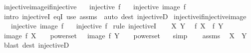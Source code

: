 \begin{isabellebody}
\ injective{\isacharunderscore}{\kern0pt}image{\isacharunderscore}{\kern0pt}if{\isacharunderscore}{\kern0pt}injective{\isacharcolon}{\kern0pt}\isanewline
\ \ \ {\isachardoublequoteopen}injective\ f{\isachardoublequoteclose}\isanewline
\ \ \ {\isachardoublequoteopen}injective\ {\isacharparenleft}{\kern0pt}image\ f{\isacharparenright}{\kern0pt}{\isachardoublequoteclose}\isanewline
%
\isadelimproof
\ \ %
\endisadelimproof
%
\isatagproof
{}\isamarkupfalse%
\ {\isacharparenleft}{\kern0pt}intro\ injectiveI\ eqI{\isacharparenright}{\kern0pt}\ {\isacharparenleft}{\kern0pt}use\ assms\ \ {\isacartoucheopen}auto\ dest{\isacharcolon}{\kern0pt}\ injectiveD{\isacartoucheclose}{\isacharparenright}{\kern0pt}%
\endisatagproof
{\isafoldproof}%
%
\isadelimproof
\isanewline
%
\endisadelimproof
\isanewline
{}\isamarkupfalse%
\ injective{\isacharunderscore}{\kern0pt}if{\isacharunderscore}{\kern0pt}injective{\isacharunderscore}{\kern0pt}image{\isacharcolon}{\kern0pt}\isanewline
\ \ \ {\isachardoublequoteopen}injective\ {\isacharparenleft}{\kern0pt}image\ f{\isacharparenright}{\kern0pt}{\isachardoublequoteclose}\isanewline
\ \ \ {\isachardoublequoteopen}injective\ f{\isachardoublequoteclose}\isanewline
%
\isadelimproof
%
\endisadelimproof
%
\isatagproof
{}\isamarkupfalse%
\ {\isacharparenleft}{\kern0pt}rule\ injectiveI{\isacharparenright}{\kern0pt}\isanewline
\ \ \isamarkupfalse%
\ X\ Y\ \isamarkupfalse%
\ {\isachardoublequoteopen}f\ X\ {\isacharequal}{\kern0pt}\ f\ Y{\isachardoublequoteclose}\isanewline
\ \ \isamarkupfalse%
\ \isamarkupfalse%
\ {\isachardoublequoteopen}image\ f\ {\isacharbraceleft}{\kern0pt}X\ {\isacharbar}{\kern0pt}\ {\isacharunderscore}{\kern0pt}\ {\isasymin}\ powerset\ {\isacharbraceleft}{\kern0pt}{\isacharbraceright}{\kern0pt}{\isacharbraceright}{\kern0pt}\ {\isacharequal}{\kern0pt}\ image\ f\ {\isacharbraceleft}{\kern0pt}Y\ {\isacharbar}{\kern0pt}\ {\isacharunderscore}{\kern0pt}\ {\isasymin}\ powerset\ {\isacharbraceleft}{\kern0pt}{\isacharbraceright}{\kern0pt}{\isacharbraceright}{\kern0pt}{\isachardoublequoteclose}\ \isamarkupfalse%
\ simp\isanewline
\ \ \isamarkupfalse%
\ assms\ \isamarkupfalse%
\ {\isachardoublequoteopen}X\ {\isacharequal}{\kern0pt}\ Y{\isachardoublequoteclose}\ \isamarkupfalse%
\ {\isacharparenleft}{\kern0pt}blast\ dest{\isacharcolon}{\kern0pt}\ injectiveD{\isacharparenright}{\kern0pt}\isanewline

\end{isabellebody}
